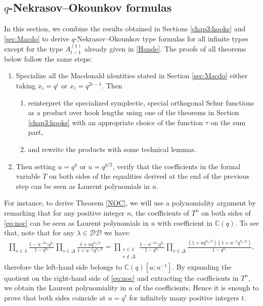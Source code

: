 \documentclass[11pt,letterpaper]{amsart}
\def\ccdd{\mathcal {DD}}
\numberwithin{equation}{section}
\numberwithin{df}{section}
\begin{document}
\subsection{$q$-Nekrasov--Okounkov formulas}\label{subsecc:qnp}
In this section, we combine the results obtained in Sections \ref{chap3:hooks} and \ref{sec:Macdo} to derive $q$-Nekrasov--Okounkov type formulas for all infinite types except for the type $A^{(1)}_{t-1}$ already given in \eqref{Hande}. The proofs of all theorems below follow the same steps:
\begin{enumerate}
\item Specialize all the Macdonald identities stated in Section \ref{sec:Macdo}  either taking $x_i=q^i$ or $x_i=q^{2i-1}$. Then
\begin{enumerate}
\item reinterpret the specialized symplectic, special orthogonal Schur functions as a product over hook lengths using one of the theorems in Section \ref{chap3:hooks} with an appropriate choice of the function $\tau$ on the sum part,
\item and rewrite the products with some technical lemmas.
\end{enumerate}  
\item Then setting $u=q^g$ or $u=q^{g/2}$, verify that the coefficients in the formal variable $T$ on both sides of the equalities derived at the end of the previous step can be seen as Laurent polynomials in $u$.
\end{enumerate}




For instance, to derive Theorem \ref{NOC}, we will use a polynomiality argument by remarking that for any positive integer $n$, the coefficients of $T^n$ on both sides of \eqref{eq:noc} can be seen as Laurent polynomials in $u$ with coefficient in $\mathbb{C}(q)$. To see that, note that for any $\lambda\in\ccdd$ we have:
\begin{multline*}
\prod_{s\in\lambda}\frac{1-u^{-2\varepsilon_s}q^{h_s}}{1-q^{h_s}}\prod_{s\in\Delta}\frac{1+uq^{h_s/2}}{1+u^{-1}q^{h_s/2}}=\prod_{\substack{s\in\lambda\\s\notin \Delta}}\frac{1-u^{-2\varepsilon_s}q^{h_s}}{1-q^{h_s}}\prod_{s\in\Delta}\frac{(1+uq^{h_s/2})(1+u^{-1}q^{h_s/2})}{1-q^{h_s}},
\end{multline*}
therefore the left-hand side belongs to $\mathbb{C}(q)[u;u^{-1}]$. By expanding the quotient on the right-hand side of \eqref{eq:noc} and extracting the coefficients in $T^n$, we obtain the Laurent polynomiality in $u$ of the coefficients. Hence it is enough to prove that both sides coincide at $u=q^t$ for infinitely many positive integers $t$.
\end{document}
